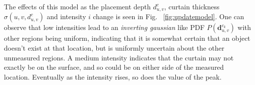 The effects of this model as the placement depth $d^c_{u, v}$, curtain thickness $\sigma(u, v, d^c_{u, v})$ and intensity $i$ change is seen in Fig. ~\ref{fig:updatemodel}. One can observe that low intensities lead to an \textit{inverting gaussian} like PDF $P\left(\mathbf{d}_{u,v}^{c_{k}}\right)$ with other regions being uniform, indicating that it is somewhat certain that an object doesn't exist at that location, but is uniformly uncertain about the other unmeasured regions. A medium intensity indicates that the curtain may not exactly be on the surface, and so could be on either side of the measured location. Eventually as the intensity rises, so does the value of the peak.